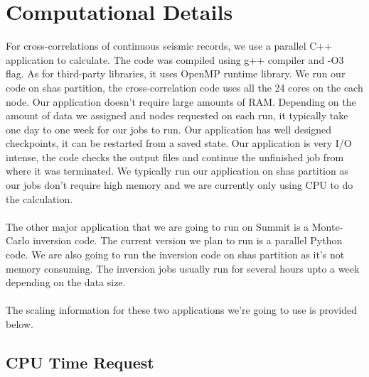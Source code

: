 \documentclass[10pt, letterpaper]{article}
\begin{document}
\section{Computational Details}\label{sec:method}

For cross-correlations of continuous seismic records, we use a parallel C++ application to calculate. The code was compiled using g++ compiler and -O3 flag. As for third-party libraries, it uses OpenMP runtime library. We run our code on shas partition, the cross-correlation code uses all the 24 cores on the each node. Our application doesn't require large amounts of RAM. Depending on the amount of data we assigned and nodes requested on each run, it typically take one day to one week for our jobs to run. Our application has well designed checkpoints, it can be restarted from a saved state. Our application is very I/O intense, the code checks the output files and continue the unfinished job from where it was terminated. We typically run our application on shas partition as our jobs don't require high memory and we are currently only using CPU to do the calculation. \\ \\
The other major application that we are going to run on Summit is a Monte-Carlo inversion code. The current version we plan to run is a parallel Python code. We are also going to run the inversion code on shas partition as it's not memory consuming. The inversion jobs usually run for several hours upto a week depending on the data size. \\ \\
The scaling information for these two applications we're going to use is provided below.

\subsection{CPU Time Request}\label{sec:request}
\end{document}
